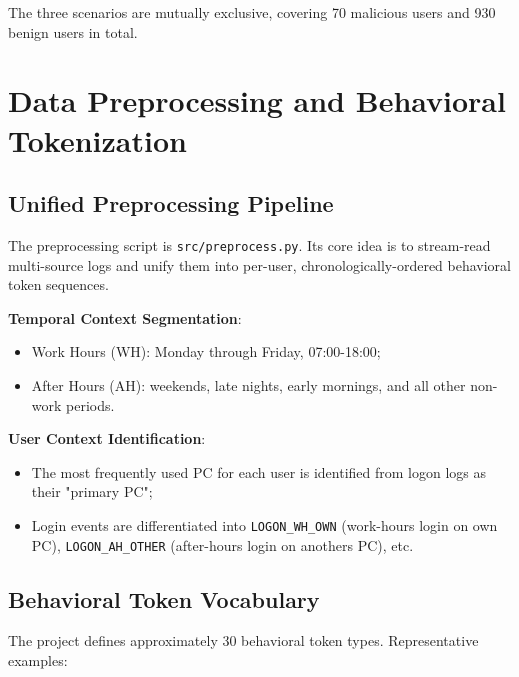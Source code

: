 \documentclass[
  a4paper,
  11pt]{article}
\providecommand{\tightlist}{%
  \setlength{\itemsep}{0pt}\setlength{\parskip}{0pt}}
\begin{document}
The three scenarios are mutually exclusive, covering 70 malicious users
and 930 benign users in total.

\section{Data Preprocessing and Behavioral
Tokenization}\label{data-preprocessing-and-behavioral-tokenization}

\subsection{Unified Preprocessing
Pipeline}\label{unified-preprocessing-pipeline}

The preprocessing script is \texttt{src/preprocess.py}. Its core idea is
to stream-read multi-source logs and unify them into per-user,
chronologically-ordered behavioral token sequences.

\textbf{Temporal Context Segmentation}:

\begin{itemize}
\tightlist
\item
  Work Hours (WH): Monday through Friday, 07:00-18:00;
\item
  After Hours (AH): weekends, late nights, early mornings, and all other
  non-work periods.
\end{itemize}

\textbf{User Context Identification}:

\begin{itemize}
\tightlist
\item
  The most frequently used PC for each user is identified from logon
  logs as their "primary PC";
\item
  Login events are differentiated into \texttt{LOGON\_WH\_OWN}
  (work-hours login on own PC), \texttt{LOGON\_AH\_OTHER} (after-hours
  login on another\textquotesingle s PC), etc.
\end{itemize}

\subsection{Behavioral Token
Vocabulary}\label{behavioral-token-vocabulary}

The project defines approximately 30 behavioral token types.
Representative examples:
\end{document}
